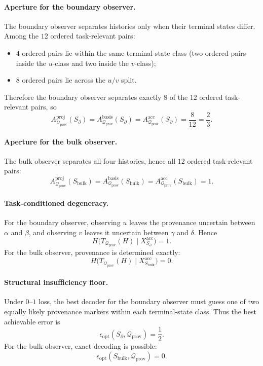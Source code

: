 \documentclass[11pt,twoside]{article}
\theoremstyle{definition}
\newcommand{\proj}{\mathrm{proj}}
\newcommand{\basis}{\mathrm{basis}}
\newcommand{\acc}{\mathrm{acc}}
\newcommand{\bulk}{\mathrm{bulk}}
\begin{document}
\paragraph{Aperture for the boundary observer.}
The boundary observer separates histories only when their terminal states differ. Among the \(12\) ordered task-relevant pairs:
\begin{itemize}[leftmargin=*]
  \item \(4\) ordered pairs lie within the same terminal-state class (two ordered pairs inside the \(u\)-class and two inside the \(v\)-class);
  \item \(8\) ordered pairs lie across the \(u/v\) split.
\end{itemize}
Therefore the boundary observer separates exactly \(8\) of the \(12\) ordered task-relevant pairs, so
\[
  A^{\proj}_{\mathcal{Q}_{\mathrm{prov}}}(S_{\partial})
  =
  A^{\basis}_{\mathcal{Q}_{\mathrm{prov}}}(S_{\partial})
  =
  A^{\acc}_{\mathcal{Q}_{\mathrm{prov}}}(S_{\partial})
  =
  \frac{8}{12}
  =
  \frac23.
\]

\paragraph{Aperture for the bulk observer.}
The bulk observer separates all four histories, hence all \(12\) ordered task-relevant pairs:
\[
  A^{\proj}_{\mathcal{Q}_{\mathrm{prov}}}(S_{\bulk})
  =
  A^{\basis}_{\mathcal{Q}_{\mathrm{prov}}}(S_{\bulk})
  =
  A^{\acc}_{\mathcal{Q}_{\mathrm{prov}}}(S_{\bulk})
  =
  1.
\]

\paragraph{Task-conditioned degeneracy.}
For the boundary observer, observing \(u\) leaves the provenance uncertain between \(\alpha\) and \(\beta\), and observing \(v\) leaves it uncertain between \(\gamma\) and \(\delta\). Hence
\[
  H\!\bigl(T_{\mathcal{Q}_{\mathrm{prov}}}(H)\mid X_{S_{\partial}}^{\acc}\bigr)
  = 1.
\]
For the bulk observer, provenance is determined exactly:
\[
  H\!\bigl(T_{\mathcal{Q}_{\mathrm{prov}}}(H)\mid X_{S_{\bulk}}^{\acc}\bigr)
  = 0.
\]

\paragraph{Structural insufficiency floor.}
Under \(0\)--\(1\) loss, the best decoder for the boundary observer must guess one of two equally likely provenance markers within each terminal-state class. Thus the best achievable error is
\[
  \epsilon_{\mathrm{opt}}(S_{\partial},\mathcal{Q}_{\mathrm{prov}})
  = \frac12.
\]
For the bulk observer, exact decoding is possible:
\[
  \epsilon_{\mathrm{opt}}(S_{\bulk},\mathcal{Q}_{\mathrm{prov}})
  = 0.
\]
\end{document}
